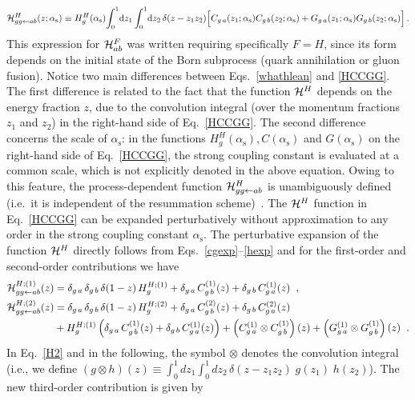 \documentclass[12pt]{article}
\def\nn{\nonumber}
\DeclareRobustCommand{\as}{\ensuremath{\alpha_{\mathrm{s}}}}
\def\ito{\leftarrow}
\DeclareRobustCommand{\rd}{\ensuremath{\mathrm{d}}}
\begin{document}
\begin{equation}
\label{HCCGG}
{\cal H}^H_{gg\ito ab}(z;\as) \equiv H_g^H(\as) \!\int_0^1\!\rd z_1 \int_0^1\!\rd z_2
\,\delta(z - z_1z_2)
\Big[ C_{g \,a}(z_1;\as) C_{g \,b}(z_2;\as)
+ G_{g \,a}(z_1;\as) G_{g \,b}(z_2;\as)\Big]\, .
\end{equation}
This expression for ${\cal H}_{ab}^F$ was written requiring specifically $F=H$, since its form depends on the initial state of the Born subprocess (quark annihilation or gluon fusion).
Notice two main differences between Eqs.~\eqref{whathlean} and \eqref{HCCGG}. The first difference is related to the fact that the function  ${\cal H}^H$ depends on the energy fraction $z$, due to the convolution integral (over the momentum fractions $z_1$ and $z_2$) in the right-hand side of Eq.~\eqref{HCCGG}. The second difference concerns the scale of $\as$: in the functions $H^H_g(\as), C(\as)$ and $G(\as)$ on the right-hand side of Eq.~\eqref{HCCGG}, the strong coupling constant is evaluated at a common scale, which is not explicitly denoted in the above equation. Owing to this feature, the process-dependent function ${\cal H}^H_{gg\ito ab}$ is unambiguously defined
(i.e.\ it is independent of the resummation scheme)~\cite{Catani:2000vq}. The ${\cal H}^H$ function in Eq.~\eqref{HCCGG} can be expanded perturbatively without approximation to any order in the strong coupling constant $\as$.
The perturbative expansion of the function
${\cal H}^H$ directly follows from Eqs.~\eqref{cgexp}--\eqref{hexp} and for the first-order and second-order contributions we have
\begin{align}
\label{H1}
{\cal H}^{H;(1)}_{gg\ito ab}(z)&=\delta_{g\,a} \,\delta_{g\,b} \,\delta(1-z) 
\,H^{H;(1)}_g+
\delta_{g\,a} \,C^{(1)}_{g\,b}(z)+\delta_{g\,b} \,C^{(1)}_{g\,a}(z) \;\; , \\
\label{H2}
{\cal H}^{H;(2)}_{gg\ito ab}(z)&=\delta_{g\,a} \,\delta_{g\,b} \,\delta(1-z)
\,H^{H;(2)}_g
+\delta_{g\,a} \,C^{(2)}_{g\,b}(z)+\delta_{g\,b} \,C^{(2)}_{g\,a}(z)
\nn\\
&
+H^{H;(1)}_g\left(\delta_{g\,a} \,C^{(1)}_{g\,b}(z)
+\delta_{g\,b} \,C^{(1)}_{g\,a}(z)\right)
+\left(C^{(1)}_{g\,a}\otimes C^{(1)}_{g\,b}\right)(z)+
\left(G^{(1)}_{g\,a}\otimes G^{(1)}_{g\,b}\right)(z)\;\; .
\end{align}
In Eq.~\eqref{H2} and in the following, the symbol $\otimes$ denotes the 
convolution integral
(i.e., we define 
$(g \otimes h) (z) \equiv \int_0^1 dz_1 \int_0^1 dz_2
\,\delta(z - z_1z_2) \;g(z_1) \;h(z_2)$).
The new third-order contribution is given by
\end{document}
